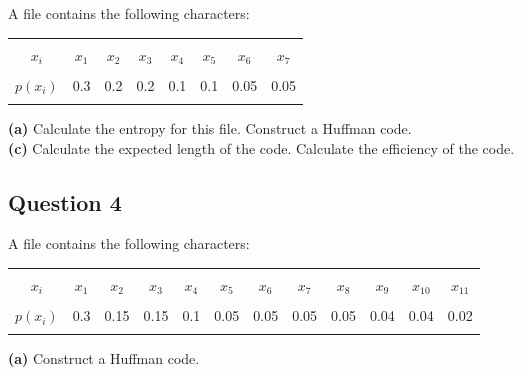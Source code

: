 \documentclass[12pt]{article}
\begin{document}
A file contains the following characters:\\[-0.1cm]
\begin{center}
\begin{tabular}{|c|ccccccc|}
\hline
&&&&&&& \\[-0.4cm]
$x_i$     & $x_1$ & $x_2$ & $x_3$ & $x_4$ & $x_5$ & $x_6$ & $x_7$ \\[0.1cm]
\hline
&&&&&&& \\[-0.4cm]
$p(x_i)$  & 0.3 & 0.2 & 0.2 & 0.1 & 0.1 & 0.05 & 0.05 \\[0.1cm]
\hline
\multicolumn{7}{c}{}\\[-0.2cm]
\end{tabular}
\end{center}

{\bf(a)} Calculate the entropy for this file.  Construct a Huffman code. \quad \\{\bf(c)} Calculate the expected length of the code.  Calculate the efficiency of the code.




\subsection*{Question 4}

A file contains the following characters:\\[-0.1cm]
\begin{center}
\begin{tabular}{|c|ccccccccccc|}
\hline
&&&&&&&&&&& \\[-0.4cm]
$x_i$     & $x_1$ & $x_2$ & $x_3$ & $x_4$ & $x_5$ & $x_6$ & $x_7$  & $x_8$ & $x_9$  & $x_{10}$ & $x_{11}$ \\[0.1cm]
\hline
&&&&&&&&&&& \\[-0.4cm]
$p(x_i)$  & 0.3 & 0.15 & 0.15 & 0.1 & 0.05 & 0.05 & 0.05 & 0.05 & 0.04 & 0.04 & 0.02 \\[0.1cm]
\hline
\multicolumn{12}{c}{}\\[-0.2cm]
\end{tabular}
\end{center}

{\bf(a)} Construct a Huffman code.
\end{document}
